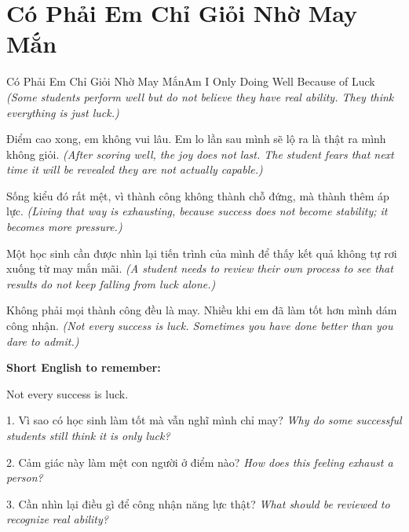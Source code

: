 \section{Có Phải Em Chỉ Giỏi Nhờ May Mắn}
\begin{truyen}{Có Phải Em Chỉ Giỏi Nhờ May Mắn}{Am I Only Doing Well Because of Luck}
\textit{(Some students perform well but do not believe they have real ability. They think everything is just luck.)}

Điểm cao xong, em không vui lâu. Em lo lần sau mình sẽ lộ ra là thật ra mình không giỏi.
\textit{(After scoring well, the joy does not last. The student fears that next time it will be revealed they are not actually capable.)}

Sống kiểu đó rất mệt, vì thành công không thành chỗ đứng, mà thành thêm áp lực.
\textit{(Living that way is exhausting, because success does not become stability; it becomes more pressure.)}

Một học sinh cần được nhìn lại tiến trình của mình để thấy kết quả không tự rơi xuống từ may mắn mãi.
\textit{(A student needs to review their own process to see that results do not keep falling from luck alone.)}
\end{truyen}

\begin{baihoc}
Không phải mọi thành công đều là may. Nhiều khi em đã làm tốt hơn mình dám công nhận.
\textit{(Not every success is luck. Sometimes you have done better than you dare to admit.)}
\end{baihoc}

\begin{ghinhoanh}
\textbf{Short English to remember:}

Not every success is luck.

\end{ghinhoanh}

\begin{tuhocnhanh}
1. Vì sao có học sinh làm tốt mà vẫn nghĩ mình chỉ may? \textit{Why do some successful students still think it is only luck?}

2. Cảm giác này làm mệt con người ở điểm nào? \textit{How does this feeling exhaust a person?}

3. Cần nhìn lại điều gì để công nhận năng lực thật? \textit{What should be reviewed to recognize real ability?}
\end{tuhocnhanh}
\ngancach

